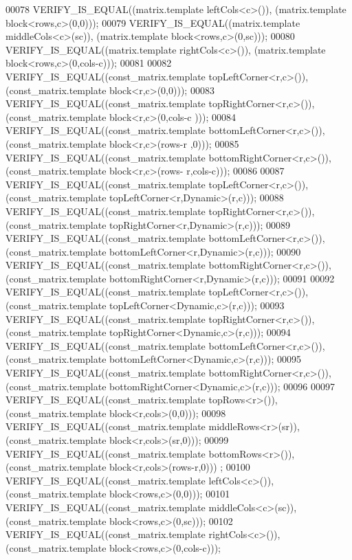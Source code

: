 \begin{DoxyCode}
00078   VERIFY\_IS\_EQUAL((matrix.template leftCols<c>()), (matrix.template block<rows,c>(0,0)));
00079   VERIFY\_IS\_EQUAL((matrix.template middleCols<c>(sc)), (matrix.template block<rows,c>(0,sc)));
00080   VERIFY\_IS\_EQUAL((matrix.template rightCols<c>()), (matrix.template block<rows,c>(0,cols-c)));
00081 
00082   VERIFY\_IS\_EQUAL((const\_matrix.template topLeftCorner<r,c>()), (const\_matrix.template block<r,c>(0,0)));
00083   VERIFY\_IS\_EQUAL((const\_matrix.template topRightCorner<r,c>()), (const\_matrix.template block<r,c>(0,cols-c
      )));
00084   VERIFY\_IS\_EQUAL((const\_matrix.template bottomLeftCorner<r,c>()), (const\_matrix.template block<r,c>(rows-r
      ,0)));
00085   VERIFY\_IS\_EQUAL((const\_matrix.template bottomRightCorner<r,c>()), (const\_matrix.template block<r,c>(rows-
      r,cols-c)));
00086 
00087   VERIFY\_IS\_EQUAL((const\_matrix.template topLeftCorner<r,c>()), (const\_matrix.template 
      topLeftCorner<r,Dynamic>(r,c)));
00088   VERIFY\_IS\_EQUAL((const\_matrix.template topRightCorner<r,c>()), (const\_matrix.template 
      topRightCorner<r,Dynamic>(r,c)));
00089   VERIFY\_IS\_EQUAL((const\_matrix.template bottomLeftCorner<r,c>()), (const\_matrix.template 
      bottomLeftCorner<r,Dynamic>(r,c)));
00090   VERIFY\_IS\_EQUAL((const\_matrix.template bottomRightCorner<r,c>()), (const\_matrix.template 
      bottomRightCorner<r,Dynamic>(r,c)));
00091 
00092   VERIFY\_IS\_EQUAL((const\_matrix.template topLeftCorner<r,c>()), (const\_matrix.template 
      topLeftCorner<Dynamic,c>(r,c)));
00093   VERIFY\_IS\_EQUAL((const\_matrix.template topRightCorner<r,c>()), (const\_matrix.template 
      topRightCorner<Dynamic,c>(r,c)));
00094   VERIFY\_IS\_EQUAL((const\_matrix.template bottomLeftCorner<r,c>()), (const\_matrix.template 
      bottomLeftCorner<Dynamic,c>(r,c)));
00095   VERIFY\_IS\_EQUAL((const\_matrix.template bottomRightCorner<r,c>()), (const\_matrix.template 
      bottomRightCorner<Dynamic,c>(r,c)));
00096 
00097   VERIFY\_IS\_EQUAL((const\_matrix.template topRows<r>()), (const\_matrix.template block<r,cols>(0,0)));
00098   VERIFY\_IS\_EQUAL((const\_matrix.template middleRows<r>(sr)), (const\_matrix.template block<r,cols>(sr,0)));
00099   VERIFY\_IS\_EQUAL((const\_matrix.template bottomRows<r>()), (const\_matrix.template block<r,cols>(rows-r,0)))
      ;
00100   VERIFY\_IS\_EQUAL((const\_matrix.template leftCols<c>()), (const\_matrix.template block<rows,c>(0,0)));
00101   VERIFY\_IS\_EQUAL((const\_matrix.template middleCols<c>(sc)), (const\_matrix.template block<rows,c>(0,sc)));
00102   VERIFY\_IS\_EQUAL((const\_matrix.template rightCols<c>()), (const\_matrix.template block<rows,c>(0,cols-c)));

\end{DoxyCode}
